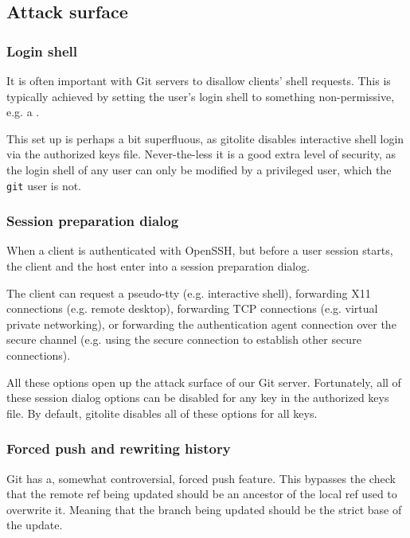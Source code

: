 \subsection{Attack surface}

\subsubsection{Login shell}

It is often important with Git servers to disallow clients' shell requests.
This is typically achieved by setting the user's login shell to something
non-permissive, e.g. a \cite{man-1-git-shell}.

This set up is perhaps a bit superfluous, as gitolite disables interactive
shell login via the authorized keys file. Never-the-less it is a good extra
level of security, as the login shell of any user can only be modified by a
privileged user, which the \texttt{git} user is not.

\subsubsection{Session preparation dialog}

When a client is authenticated with OpenSSH, but before a user session starts,
the client and the host enter into a session preparation dialog.

The client can request a pseudo-tty (e.g. interactive shell), forwarding X11
connections (e.g. remote desktop), forwarding TCP connections (e.g. virtual
private networking), or forwarding the authentication agent connection over the
secure channel (e.g. using the secure connection to establish other secure
connections).

All these options open up the attack surface of our Git server. Fortunately,
all of these session dialog options can be disabled for any key in the
authorized keys file\cite{man-8-sshd}. By default, gitolite disables all of
these options for all keys.

\subsubsection{Forced push and rewriting history}\label{section:forced-push}

Git has a, somewhat controversial\cite{torvalds-2007,hamano-2009,rego-2013},
forced push feature. This bypasses the check that the remote ref being updated
should be an ancestor of the local ref used to overwrite
it\cite{man-1-git-push}. Meaning that the branch being updated should be the
strict base of the update.

